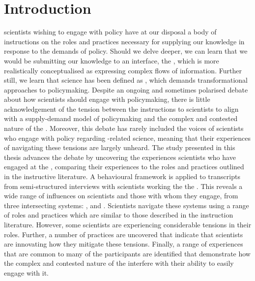 \chapter{Introduction}\label{ch:intro}

\CAN{} scientists wishing to engage with policy have at our disposal a body of instructions on the roles and practices necessary for supplying our knowledge in response to the demands of policy. Should we delve deeper, we can learn that we would be submitting our knowledge to an interface, the \SPI, which is more realistically conceptualised as expressing complex flows of information. Further still, we learn that \CAN{} science has been defined as \PNS{}, which demands transformational approaches to policymaking. Despite an ongoing and sometimes polarised debate about how scientists should engage with policymaking, there is little acknowledgement of the tension between the instructions to scientists to align with a supply-demand model of policymaking and the complex and contested nature of the \CAN{} \SPI. Moreover, this debate has rarely included the voices of scientists who engage with policy regarding \CAN-related science, meaning that their experiences of navigating these tensions are largely unheard. The study presented in this thesis advances the debate by uncovering the experiences scientists who have engaged at the \CAN{} \SPI, comparing their experiences to the roles and practices outlined in the instructive literature. A behavioural framework is applied to transcripts from semi-structured interviews with scientists working the the \CAN{} \SPI. This reveals a wide range of influences on scientists and those with whom they engage, from three intersecting systems: \skiinte, \skiknow{} and \skipoli. Scientists navigate these systems using a range of roles and practices which are similar to those described in the instruction literature. However, some scientists are experiencing considerable tensions in their roles. Further, a number of practices are uncovered that indicate that scientists are innovating how they mitigate these tensions. Finally, a range of experiences that are common to many of the participants are identified that demonstrate how the complex and contested nature of the \CAN{} \SPI{} interfere with their ability to easily engage with it.


